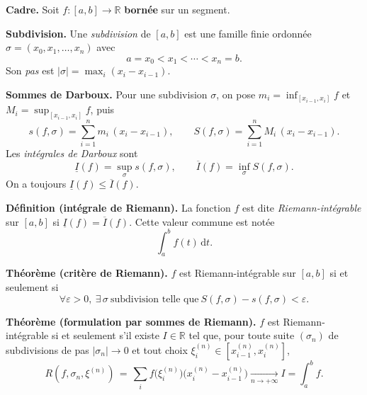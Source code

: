 


\begin{tcolorbox}[thmbox]
  \textbf{Cadre.}\enspace%
  Soit $f:[a,b]\to\mathbb{R}$ \textbf{bornée} sur un segment.

  \medskip
  \textbf{Subdivision.}\enspace{}
  Une \emph{subdivision} de $[a,b]$ est une famille finie ordonnée
  $\sigma = (x_0, x_1, \ldots, x_n)$ avec
  \[
    a = x_0 < x_1 < \cdots < x_n = b.
  \]
  Son \emph{pas} est $|\sigma| = \max_{i}(x_i - x_{i-1})$.

  \medskip
  \textbf{Sommes de Darboux.}\enspace{}
  Pour une subdivision $\sigma$, on pose
  $m_i = \inf_{[x_{i-1},x_i]} f$ et $M_i = \sup_{[x_{i-1},x_i]} f$, puis
  \[
    s(f,\sigma) = \sum_{i=1}^{n} m_i\,(x_i - x_{i-1}),
    \qquad
    S(f,\sigma) = \sum_{i=1}^{n} M_i\,(x_i - x_{i-1}).
  \]
  Les \emph{intégrales de Darboux} sont
  \[
    \underline{I}(f) = \sup_\sigma s(f,\sigma),
    \qquad
    \overline{I}(f) = \inf_\sigma S(f,\sigma).
  \]
  On a toujours $\underline{I}(f) \leq \overline{I}(f)$.

  \medskip
  \textbf{Définition (intégrale de Riemann).}\enspace%
  La fonction $f$ est dite \emph{Riemann-intégrable} sur $[a,b]$ si
  $\underline{I}(f) = \overline{I}(f)$. Cette valeur commune est notée
  \[
    \int_a^b f(t)\,\mathrm{d}t.
  \]

  \medskip
  \textbf{Théorème (critère de Riemann).}\enspace%
  $f$ est Riemann-intégrable sur $[a,b]$ si et seulement si
  \[
    \forall\varepsilon > 0,\ \exists\,\sigma\ \text{subdivision telle que}\
    S(f,\sigma) - s(f,\sigma) < \varepsilon.
  \]

  \medskip
  \textbf{Théorème (formulation par sommes de Riemann).}\enspace%
  \index{sommes de Riemann}
  $f$ est Riemann-intégrable si et seulement s'il existe $I\in\mathbb{R}$ tel
  que, pour toute suite $(\sigma_n)$ de subdivisions de pas $|\sigma_n|\to 0$
  et tout choix $\xi_i^{(n)} \in [x_{i-1}^{(n)}, x_i^{(n)}]$,
  \[
    R(f,\sigma_n,\xi^{(n)}) \,=\, \sum_{i} f\bigl(\xi_i^{(n)}\bigr)\bigl(x_i^{(n)} - x_{i-1}^{(n)}\bigr)
    \xrightarrow[n\to+\infty]{} I = \int_a^b f.
  \]
\end{tcolorbox}

